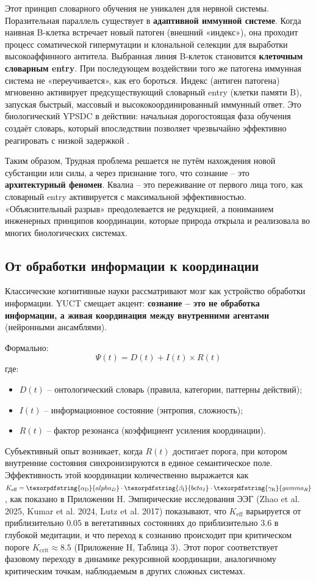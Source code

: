 \documentclass[12pt,a4paper]{article}
\DeclareRobustCommand{\alD}{\texorpdfstring{\ensuremath{\alpha_{\mathrm{D}}}}{alpha_D}}
\DeclareRobustCommand{\beI}{\texorpdfstring{\ensuremath{\beta_{\mathrm{I}}}}{beta_I}}
\DeclareRobustCommand{\gaR}{\texorpdfstring{\ensuremath{\gamma_{\mathrm{R}}}}{gamma_R}}
\newcommand{\eff}{\mathrm{eff}}
\newcommand{\Ke}{K_{\eff}}
\newcommand{\Kcrit}{K_{\mathrm{crit}}}
\begin{document}
	Этот принцип словарного обучения не уникален для нервной системы. Поразительная параллель существует в \textbf{адаптивной иммунной системе}. Когда наивная B-клетка встречает новый патоген (внешний «индекс»), она проходит процесс соматической гипермутации и клональной селекции для выработки высокоаффинного антитела. Выбранная линия B-клеток становится \textbf{клеточным словарным entry}. При последующем воздействии того же патогена иммунная система не «переучивается», как его бороться. Индекс (антиген патогена) мгновенно активирует предсуществующий словарный entry (клетки памяти B), запуская быстрый, массовый и высококоординированный иммунный ответ. Это биологический YPSDC в действии: начальная дорогостоящая фаза обучения создаёт словарь, который впоследствии позволяет чрезвычайно эффективно реагировать с низкой задержкой \cite{Alberts2014}.
	
	Таким образом, Трудная проблема решается не путём нахождения новой субстанции или силы, а через признание того, что сознание – это \textbf{архитектурный феномен}. Квалиа – это переживание от первого лица того, как словарный entry активируется с максимальной эффективностью. «Объяснительный разрыв» преодолевается не редукцией, а пониманием инженерных принципов координации, которые природа открыла и реализовала во многих биологических системах.
	
	\subsection{От обработки информации к координации}
	
	Классические когнитивные науки рассматривают мозг как устройство обработки информации. YUCT смещает акцент: \textbf{сознание – это не обработка информации, а живая координация между внутренними агентами} (нейронными ансамблями).
	
	Формально:
	\[
	\Psi(t) = D(t) + I(t) \times R(t)
	\]
	где:
	\begin{itemize}
		\item $D(t)$ – онтологический словарь (правила, категории, паттерны действий);
		\item $I(t)$ – информационное состояние (энтропия, сложность);
		\item $R(t)$ – фактор резонанса (коэффициент усиления координации).
	\end{itemize}
	
	Субъективный опыт возникает, когда $R(t)$ достигает порога, при котором внутренние состояния синхронизируются в единое семантическое поле. Эффективность этой координации количественно выражается как $\Ke = \alD \cdot \beI \cdot \gaR$, как показано в Приложении H. Эмпирические исследования ЭЭГ (Zhao et al. 2025, Kumar et al. 2024, Lutz et al. 2017) показывают, что $\Ke$ варьируется от приблизительно $0.05$ в вегетативных состояниях до приблизительно $3.6$ в глубокой медитации, и что переход к сознанию происходит при критическом пороге $\Kcrit \approx 8.5$ (Приложение H, Таблица 3). Этот порог соответствует фазовому переходу в динамике рекурсивной координации, аналогичному критическим точкам, наблюдаемым в других сложных системах.
	
\end{document}
